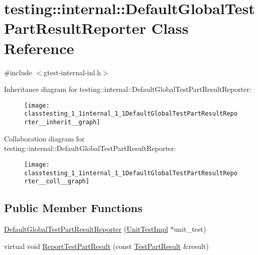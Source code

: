 \hypertarget{classtesting_1_1internal_1_1DefaultGlobalTestPartResultReporter}{}\section{testing\+:\+:internal\+:\+:Default\+Global\+Test\+Part\+Result\+Reporter Class Reference}
\label{classtesting_1_1internal_1_1DefaultGlobalTestPartResultReporter}


{\ttfamily \#include $<$gtest-\/internal-\/inl.\+h$>$}



Inheritance diagram for testing\+:\+:internal\+:\+:Default\+Global\+Test\+Part\+Result\+Reporter\+:\nopagebreak
\begin{figure}[H]
\begin{center}
\leavevmode
\texttt{[image: classtesting\_1\_1internal\_1\_1DefaultGlobalTestPartResultReporter\_\_inherit\_\_graph]}
\end{center}
\end{figure}


Collaboration diagram for testing\+:\+:internal\+:\+:Default\+Global\+Test\+Part\+Result\+Reporter\+:\nopagebreak
\begin{figure}[H]
\begin{center}
\leavevmode
\texttt{[image: classtesting\_1\_1internal\_1\_1DefaultGlobalTestPartResultReporter\_\_coll\_\_graph]}
\end{center}
\end{figure}
\subsection*{Public Member Functions}
\begin{DoxyCompactItemize}
\item 
\hyperlink{classtesting_1_1internal_1_1DefaultGlobalTestPartResultReporter_a3900ea7f34b34afd48c7d1d0312a1488}{Default\+Global\+Test\+Part\+Result\+Reporter} (\hyperlink{classtesting_1_1internal_1_1UnitTestImpl}{Unit\+Test\+Impl} $\ast$unit\+\_\+test)
\item 
virtual void \hyperlink{classtesting_1_1internal_1_1DefaultGlobalTestPartResultReporter_a6081576a23b964cfecab1e424d8044fc}{Report\+Test\+Part\+Result} (const \hyperlink{classtesting_1_1TestPartResult}{Test\+Part\+Result} \&result)
\end{DoxyCompactItemize}


